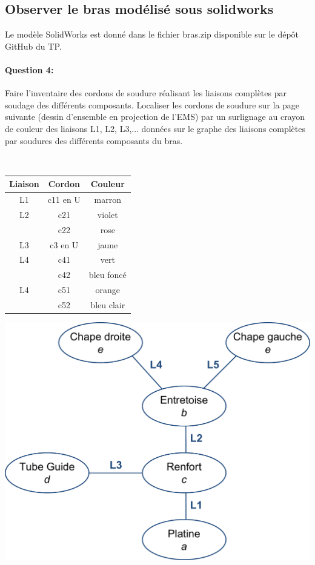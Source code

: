 \subsection{Observer le bras modélisé sous solidworks}

Le modèle SolidWorks est donné dans le fichier bras.zip disponible sur le dépôt GitHub du TP.

\paragraph{Question 4:} Faire l'inventaire des cordons de soudure réalisant les liaisons complètes par soudage des différents composants. Localiser les cordons de soudure sur la page suivante (dessin d'ensemble en projection de l'EMS) par un surlignage au crayon de couleur des liaisons L1, L2, L3,... données sur le graphe des liaisons complètes par soudures des différents composants du bras.

~\

\begin{minipage}{0.45\linewidth}
 \begin{center}
  \begin{tabular}{|c|c|c|}
  \hline
  Liaison & Cordon & Couleur \\
  \hline
  L1 & c11 en U & marron \\
  \hline
  L2 & c21 & violet \\
  \cline{2-3}
   & c22 & rose \\
  \hline
  L3 & c3 en U & jaune \\
  \hline
  L4 & c41 & vert \\
  \cline{2-3}
  & c42 & bleu foncé \\
  \hline
  L4 & c51 & orange \\
  \cline{2-3}
  & c52 & bleu clair \\
  \hline
  \end{tabular} 
 \end{center}
\end{minipage}
\begin{minipage}{0.45\linewidth}
\begin{center}
 \includegraphics[width=0.9\linewidth]{img/Liaisons}
\end{center}
\end{minipage}

